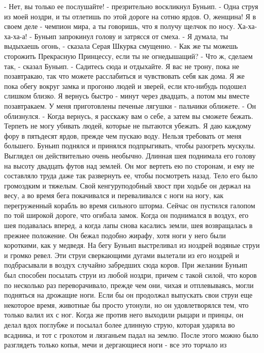     - Нет, вы только ее послушайте! - презрительно воскликнул Буньип. 
- Одна струя из моей ноздри, и ты отлетишь по этой дороге на сотню 
ярдов. О, женщина! Я в своем деле - чемпион мира, а ты говоришь, что я 
получу щелчок по носу. Ха-ха-ха-ха-а! - Буньип запрокинул голову и 
затрясся от смеха.
    - Я думала, ты выдыхаешь огонь, - сказала Серая Шкурка смущенно. - 
Как же ты можешь сторожить Прекрасную Принцессу, если ты не 
огнедышащий?
    - Что ж, сделаем так, - сказал Буньип. - Садитесь сюда и 
отдыхайте. Я вас не трону, пока не позавтракаю, так что можете 
расслабиться и чувствовать себя как дома. Я же пока обегу вокруг замка 
и прогоню людей и зверей, если кто-нибудь подошел слишком близко. Я 
вернусь быстро - минут через двадцать, а потом мы вместе позавтракаем. 
У меня приготовлены печеные лягушки - пальчики оближете. - Он 
облизнулся. - Когда вернусь, я расскажу вам о себе, а затем вы сможете 
бежать. Терпеть не могу убивать людей, которые не пытаются убежать. Я 
даю каждому фору в пятьдесят ярдов, прежде чем пускаю воду. Нельзя 
требовать от меня большего.
    Буньип поднялся и принялся подпрыгивать, чтобы разогреть мускулы. 
Выглядел он действительно очень необычно. Длинная шея поднимала его 
голову на высоту двадцать футов над землей. Он мог вертеть ею по 
сторонам, и ему не составляло труда даже так развернуть ее, чтобы 
посмотреть назад. Тело его было громоздким и тяжелым. Свой 
кенгуруподобный хвост при ходьбе он держал на весу, а во время бега 
покачивался и переваливался с ноги на ногу, как перегруженный корабль 
во время сильного шторма.
    Сейчас он пустился галопом по той широкой дороге, что огибала 
замок. Когда он поднимался в воздух, его шея подавалась вперед, а 
когда лапы снова касались земли, шея возвращалась в прежнее положение. 
Он бежал подобно жирафу, хотя ноги у него были короткими, как у 
медведя. На бегу Буньип выстреливал из ноздрей водяные струи и громко 
ревел. Эти струи сверкающими дугами вылетали из его ноздрей и 
подбрасывали в воздух случайно забредших сюда коров. При желании 
Буньип был способен посылать струи из любой ноздри, причем с такой 
силой, что коров по несколько раз переворачивало, прежде чем они, 
чихая и отплевываясь, могли подняться на дрожащие ноги.
    Если бы он продолжал выпускать свои струи еще некоторое время, 
животные бы просто утонули, но он удовлетворялся тем, что только валил 
их с ног. Когда же против него выходили рыцари и принцы, он делал вдох 
поглубже и посылал более длинную струю, которая ударяла во всадника, и 
тот с грохотом и лязганьем падал на землю. После этого можно было 
разглядеть только копья, мечи и дергающиеся ноги - все это торчало из 
